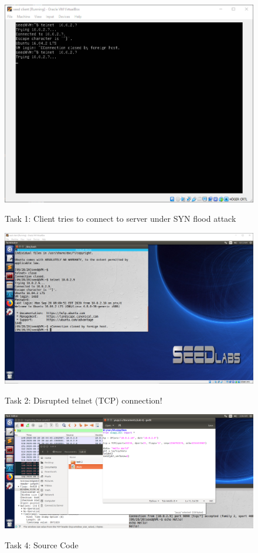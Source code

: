 \documentclass[a4paper]{article}
\begin{document}
\begin{figure}[h]
    \caption{Task 1: Client tries to connect to server under SYN flood attack}
    \includegraphics[width=\textwidth]{task1_cantconnect.png}
    \label{task1_cantconnect}
\end{figure}
\begin{figure}[h]
    \caption{Task 2: Disrupted telnet (TCP) connection!}
    \includegraphics[width=\textwidth]{task2.png}
    \label{task2}
\end{figure}
\begin{figure}[h]
    \caption{Task 4: Source Code}
    \includegraphics[width=\textwidth]{task4_code.png}
    \label{task4_code}
\end{figure}
\end{document}
